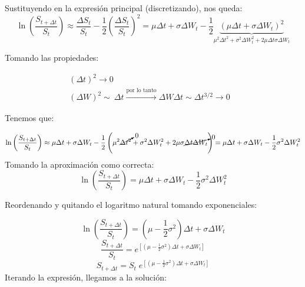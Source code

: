 \documentclass[12pt,a4paper]{article}
\begin{document}
Sustituyendo en la expresión principal (discretizando), nos queda:
\begin{equation}
\ln \left (  \frac{S_{t+ \Delta t}}{S_{t}} \right ) \approx  \frac{\Delta S_{t}}{S_{t}} - \frac{1}{2} \left (  \frac{\Delta S_{t}}{S_{t}} \right )^{2} = \mu \Delta t + \sigma \Delta W_{t} - \frac{1}{2} \underset{    \mu^2 \Delta t^2 + \sigma^2 \Delta W_{t}^2 + 2  \mu \Delta t \sigma \Delta W_{t}       }{\underbrace{\left ( \mu \Delta t + \sigma \Delta W_{t} \right )^2}}
\end{equation}

Tomando las propiedades:

\begin{equation}
\begin{matrix}
\left ( \Delta t \right )^2 \to 0 \;\;\;\;\;\;\;\;\;\;\;\;\;\;\;\;\;\;\;\;\;\;\;\;\;\;\;\;\;\;\;\;\;\;\;\;\;\;\;\;\;\;\;\;\;\;\;\;\;\;\;\;\;\;\\
\left ( \Delta W \right )^2 \sim \ \Delta t \xrightarrow{\textrm{por lo tanto}} \Delta W \Delta t \sim \Delta t ^{3/2} \to 0
\end{matrix}
\end{equation}


Tenemos que:

\begin{equation*}
\ln \left (  \frac{S_{t+ \Delta t}}{S_{t}} \right ) \approx \mu \Delta t + \sigma \Delta W_{t} - \frac{1}{2} \left (   \mu^2 \cancelto{0}{ \Delta t^2} + \sigma^2 \Delta W_{t}^2 + 2  \mu \sigma   \cancelto{0}{\Delta t \Delta W_{t}} \right ) = \mu \Delta t + \sigma \Delta W_{t} - \frac{1}{2} \sigma^2 \Delta W_{t}^2  
\end{equation*}
Tomando la aproximación como correcta:
\begin{equation}
\ln \left (  \frac{S_{t+ \Delta t}}{S_{t}} \right ) = \mu \Delta t + \sigma \Delta W_{t} - \frac{1}{2} \sigma^2 \Delta W_{t}^2
\end{equation}

Reordenando y quitando el logaritmo natural tomando exponenciales:

\begin{equation*}
\ln\left(\frac{S_{t+\Delta t}}{S_{t}}\right)
= \left(\mu - \frac{1}{2}\sigma^2\right)\Delta t + \sigma \Delta W_{t}
\end{equation*}
\begin{equation*}
\frac{S_{t+\Delta t}}{S_t}
= e^{\left[\left(\mu - \frac{1}{2}\sigma^2\right)\Delta t + \sigma \Delta W_{t} \right]}
\end{equation*}
\begin{equation}
S_{t+ \Delta t}
= S_{t} \; e^{  \left[\left(\mu - \frac{1}{2}\sigma^2\right)\Delta t + \sigma \Delta W_{t} \right]}
\end{equation}
Iterando la expresión, llegamos a la solución:
\end{document}
